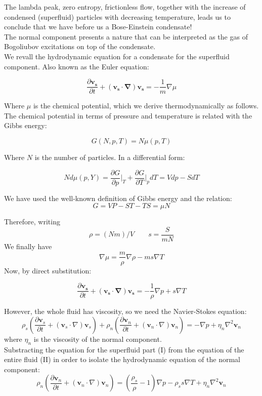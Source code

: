 \documentclass{article}
\begin{document}
The lambda peak, zero entropy, frictionless flow, together with the increase of condensed (superfluid) particles with decreasing temperature, leads us to conclude that we have before us a Bose-Einstein condensate!
\\

The normal component presents a nature that can be interpreted as the gas of Bogoliubov excitations on top of the condensate.
\\

We revall the hydrodynamic equation for a condensate for the superfluid component. Also known as the Euler equation: 

\[\frac{\partial \mathbf{v_s}}{\partial t} + (\mathbf{v_s}\cdot \mathbf{\nabla})\mathbf{v_s} = -\frac{1}{m}\nabla \mu\]

Where $\mu$ is the chemical potential, which we derive thermodynamically as follows. The chemical potential in terms of pressure and temperature is related with the Gibbs energy:

\[G(N, p, T)= N \mu(p, T)\]

Where $N$ is the number of particles. In a differential form:

\[N d\mu(p, Y) = \frac{\partial G}{\partial p} \bigg|_T + \frac{\partial G}{\partial T}\bigg|_pdT = Vdp - S dT\]

We have used the well-known definition of Gibbs energy and the relation:
\[G = VP - ST - TS = \mu N\]

Therefore, writing 
\[\rho = (Nm)/V \qquad s = \frac{S}{mN}\]
We finally have
\[\nabla \mu = \frac{m}{\rho} \nabla \rho - m s \nabla T\]
Now, by direct substitution:

\[\frac{\partial \mathbf{v_s}}{\partial t} + (\mathbf{v_s}\cdot \mathbf{\nabla})\mathbf{v_s} = -\frac{1}{\rho}\nabla p + s \nabla T \tag{I}\]

However, the whole fluid has viscosity, so we need the Navier-Stokes equation:
\[
\rho_s \left( \frac{\partial \mathbf{v}_s}{\partial t} + (\mathbf{v}_s \cdot \nabla) \mathbf{v}_s \right) + \rho_n \left( \frac{\partial \mathbf{v}_n}{\partial t} + (\mathbf{v}_n \cdot \nabla) \mathbf{v}_n \right) = -\nabla p + \eta_n \nabla^2 \mathbf{v}_n \tag{II}
\]
where $\eta_n$ is the viscosity of the normal component.
\\

Substracting the equation for the superfluid part (I) from the equation of the entire fluid (II) in order to isolate the hydrodynamic equation of the normal component:
\[
\rho_n \left( \frac{\partial \mathbf{v}_n}{\partial t} + (\mathbf{v}_n \cdot \nabla) \mathbf{v}_n \right) = \left( \frac{\rho_s}{\rho} - 1 \right) \nabla p - \rho_s s \nabla T + \eta_n \nabla^2 \mathbf{v}_n \]
\end{document}
